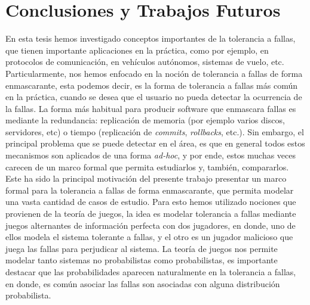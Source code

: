 \chapter{Conclusiones y Trabajos Futuros}
\label{cap:conclusiones}
En esta tesis hemos investigado conceptos importantes de la tolerancia a fallas, que tienen importante aplicaciones en la práctica, como por ejemplo, en protocolos de comunicación, en vehículos autónomos, sistemas de vuelo, etc. Particularmente, nos hemos enfocado en la noción de tolerancia a fallas de forma enmascarante, esta podemos decir, es la forma de tolerancia a fallas más común en la práctica, cuando se desea que el usuario no pueda detectar la ocurrencia de la fallas. La forma más habitual para producir software que enmascara fallas es mediante la redundancia: replicación de memoria (por ejemplo varios discos, servidores, etc)  o tiempo (replicación de \textit{commits}, \textit{rollbacks}, etc.).  Sin embargo, el principal problema que se puede detectar en el área, es que en general todos estos mecanismos son aplicados de una forma \emph{ad-hoc}, y por ende, estos muchas veces carecen de un marco formal que permita estudiarlos y, también, compararlos. Este ha sido la principal motivación del presente trabajo presentar un marco formal para la tolerancia a fallas de forma enmascarante, que permita modelar una vasta cantidad de casos de estudio. Para esto hemos utilizado nociones que provienen de la teoría de juegos, la idea es modelar tolerancia a fallas mediante juegos alternantes de información perfecta con dos jugadores, en donde, uno de ellos modela el sistema tolerante a fallas, y el otro es un jugador malicioso que juega las fallas para perjudicar al sistema. La teoría de juegos nos permite modelar tanto sistemas no probabilistas como probabilistas, es importante destacar que las probabilidades aparecen naturalmente en la tolerancia a fallas, en donde, es común asociar las fallas son asociadas con alguna distribución probabilista.


